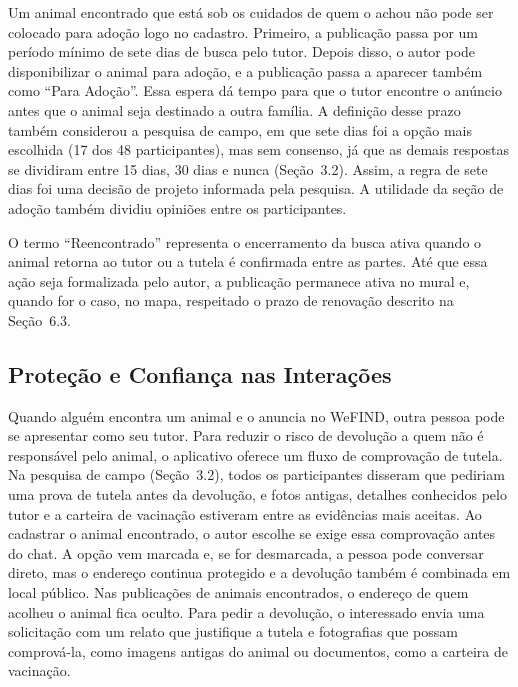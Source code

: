 Um animal encontrado que está sob os cuidados de quem o achou não pode ser colocado para adoção logo no cadastro. Primeiro, a publicação passa por um período mínimo de sete dias de busca pelo tutor. Depois disso, o autor pode disponibilizar o animal para adoção, e a publicação passa a aparecer também como ``Para Adoção''. Essa espera dá tempo para que o tutor encontre o anúncio antes que o animal seja destinado a outra família. A definição desse prazo também considerou a pesquisa de campo, em que sete dias foi a opção mais escolhida (17 dos 48 participantes), mas sem consenso, já que as demais respostas se dividiram entre 15 dias, 30 dias e nunca (Seção~3.2). Assim, a regra de sete dias foi uma decisão de projeto informada pela pesquisa. A utilidade da seção de adoção também dividiu opiniões entre os participantes.

O termo ``Reencontrado'' representa o encerramento da busca ativa quando o animal retorna ao tutor ou a tutela é confirmada entre as partes. Até que essa ação seja formalizada pelo autor, a publicação permanece ativa no mural e, quando for o caso, no mapa, respeitado o prazo de renovação descrito na Seção~6.3.

\subsection{Proteção e Confiança nas Interações}\label{sec:tutela}\label{sec:privacidade}\label{sec:classificacao}

Quando alguém encontra um animal e o anuncia no WeFIND, outra pessoa pode se apresentar como seu tutor. Para reduzir o risco de devolução a quem não é responsável pelo animal, o aplicativo oferece um fluxo de comprovação de tutela. Na pesquisa de campo (Seção~3.2), todos os participantes disseram que pediriam uma prova de tutela antes da devolução, e fotos antigas, detalhes conhecidos pelo tutor e a carteira de vacinação estiveram entre as evidências mais aceitas. Ao cadastrar o animal encontrado, o autor escolhe se exige essa comprovação antes do chat. A opção vem marcada e, se for desmarcada, a pessoa pode conversar direto, mas o endereço continua protegido e a devolução também é combinada em local público. Nas publicações de animais encontrados, o endereço de quem acolheu o animal fica oculto. Para pedir a devolução, o interessado envia uma solicitação com um relato que justifique a tutela e fotografias que possam comprová-la, como imagens antigas do animal ou documentos, como a carteira de vacinação.

